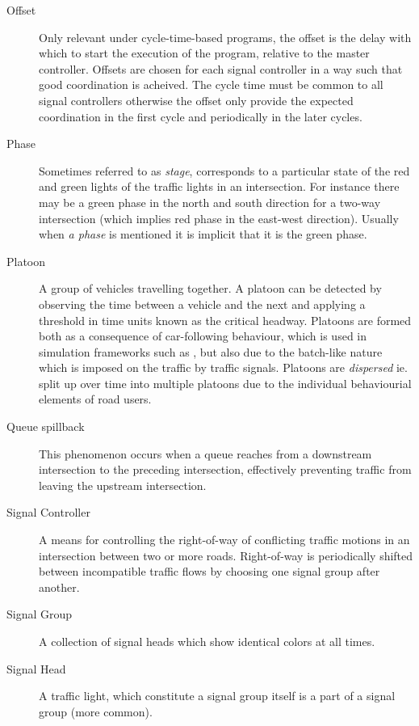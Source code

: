 \begin{description}
\item[Offset] Only relevant under cycle-time-based programs, the offset is the delay with which to start the execution of the program, relative to the master controller. Offsets are chosen for each signal controller in a way such that good coordination is acheived. The cycle time must be common to all signal controllers otherwise the offset only provide the expected coordination in the first cycle and periodically in the later cycles.
	
	\item[Phase] Sometimes referred to as \textit{stage}, corresponds to a particular state of the red and green lights of the traffic lights in an intersection.
	For instance there may be a green phase in the north and south direction for a two-way intersection (which implies red phase in the east-west direction). Usually when \textit{a phase} is mentioned it is implicit that it is the green phase.
	
	\item[Platoon] A group of vehicles travelling together. A platoon can be detected by observing the time between a vehicle and the next and applying a threshold in time units known as the critical headway.
Platoons are formed both as a consequence of car-following behaviour, which is used in simulation frameworks such as \cite{treiber-2000-62}, but also due to the batch-like nature which is imposed on the traffic by traffic signals.
Platoons are \textit{dispersed} ie. split up over time into multiple platoons due to the individual behaviourial elements of road users.

\item[Queue spillback] This phenomenon occurs when a queue reaches from a downstream intersection to the preceding intersection, effectively preventing traffic from leaving the upstream intersection.

\item[Signal Controller] A means for controlling the right-of-way of conflicting traffic motions in an intersection between two or more roads. Right-of-way is periodically shifted between incompatible traffic flows by choosing one signal group after another.

\item[Signal Group] A collection of signal heads which show identical colors at all times.

\item[Signal Head] A traffic light, which constitute a signal group itself is a part of a signal group (more common).


\end{description}
